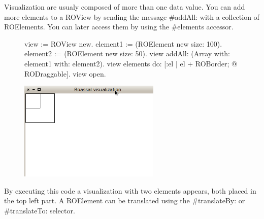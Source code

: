 \documentclass[a4paper,10pt,twoside]{book}
\begin{document}
Visualization are usualy composed of more than one data value. You can add more elements to a ROView by sending the message \#addAll: with a collection of ROElements. You can later access them by using the \#elements accessor. 

\begin{figure}[H]
      \begin{minipage}[t]{0.5\textwidth}
      \vspace{0pt}
\begin{code}{}
view := ROView new.
element1 := (ROElement new size: 100).
element2 := (ROElement new size: 50).
view addAll: (Array with: element1 with: element2).
view elements do: [:el | el + ROBorder; @ RODraggable].
view open.
\end{code}
   \end{minipage}
   \hfill
   \begin{minipage}[t]{0.6\textwidth}
      \vspace{0pt} \raggedright
       \centering
		\includegraphics[width=0.6\textwidth]{ex3}
   \end{minipage}
\label{fig:ex3}
\end{figure}

By executing this code a visualization with two elements appears, both placed in the top left part. A ROElement can be translated using the \#translateBy: or \#translateTo: selector.
\end{document}
